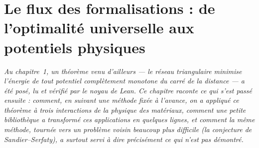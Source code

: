 

\chapter{Le flux des formalisations : de l'optimalité universelle aux potentiels physiques}\label{ch2:chapitre}

\begin{center}
\begin{minipage}{0.9\linewidth}\small\itshape
Au chapitre~1, un théorème venu d'ailleurs --- le réseau triangulaire minimise l'énergie de tout potentiel complètement
monotone du carré de la distance --- a été posé, lu et vérifié par le noyau de Lean. Ce chapitre raconte ce qui s'est
passé ensuite : comment, en suivant une méthode fixée à l'avance, on a appliqué ce théorème à trois interactions de la
physique des matériaux, comment une petite bibliothèque a transformé ces applications en quelques lignes, et comment la
même méthode, tournée vers un problème voisin beaucoup plus difficile (la conjecture de Sandier--Serfaty), a surtout
servi à dire précisément ce qui \emph{n'est pas} démontré.
\end{minipage}
\end{center}

